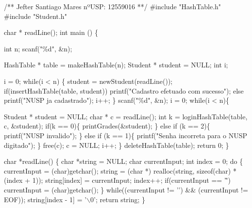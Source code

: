 \documentclass[11pt]{article}
\author{Jefter Santiago}
\date{\today}
\title{}
\begin{document}
\tableofcontents

/**
   Jefter Santiago Mares
   nºUSP: 12559016
 **/
\#include "HashTable.h"
\#include "Student.h"


char * readLine();
int main () \{

int n;
scanf("\%d\n", \&n);

HashTable * table = makeHashTable(n);
Student * student = NULL;
int i;

i = 0;
while(i < n) \{
  student = newStudent(readLine());
  if(insertHashTable(table, student))
    printf("Cadastro efetuado com sucesso\n");
  else
    printf("NUSP ja cadastrado\n");
  i++;
\}
scanf("\%d\n", \&n);
i = 0;
while(i < n)\{

    Student * student = NULL;
    char * c =  readLine();
    int k = loginHashTable(table, c, \&student);
    if(k == 0)\{
      printGrades(\&student);
    \}
    else if (k == 2)\{
      printf("NUSP invalido\n");
    \}
    else if (k == 1)\{
      printf("Senha incorreta para o NUSP digitado\n");
    \}
    free(c);
    c = NULL;
    i++;
  \}
  deleteHashTable(table);
  return 0;
\}


char *readLine() \{
  char *string = NULL;
  char currentInput;
  int index = 0;
  do \{
    currentInput = (char)getchar();
    string = (char *) realloc(string, sizeof(char) * (index + 1));
    string[index] = currentInput;
    index++;
    if(currentInput == '\r')
      currentInput = (char)getchar();
  \} while((currentInput != '\n') \&\& (currentInput != EOF));
  string[index - 1] = '$\backslash$0';
  return string;
\}
\end{document}

